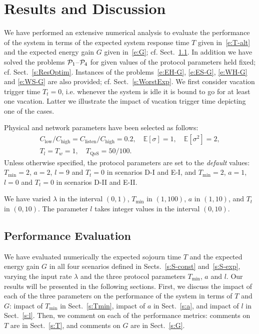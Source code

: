 \documentclass[journal]{IEEEtran}
\newcommand {\barr} {\begin{array}}
\newcommand {\earr} {\end{array}}
\def \E{{\mathbb E}}
\begin{document}
\section{Results and Discussion}
\label{s:res}
We have performed an extensive numerical analysis to evaluate the performance of the system in terms of the expected system response time $T$ given in~\eqref{e:T-alt} and the expected energy gain $G$ given in~\eqref{e:G}; cf. Sect.~\ref{s:ResPeva}. In addition we have solved the problems ${\cal P}_1$--${\cal P}_4$ for given values of the protocol parameters held fixed; cf. Sect.~\ref{s:ResOptim}. Instances of the problems~\eqref{e:EH-G}, \eqref{e:ES-G}, \eqref{e:WH-G} and \eqref{e:WS-G} are also provided; cf. Sect.~\ref{s:WorstExp}. We first consider vacation trigger time $T_t=0$, i.e. whenever the system is idle it is bound to go for at least one vacation. Latter we illustrate the impact of vacation trigger time depicting one of the cases.

Physical and network parameters have been selected as follows:
\[
\barr{lll}
{C_{\textrm{low}}}/{C_{\textrm{high}}}={ C_{\textrm{listen}}}/{C_{\textrm{high}}}=0.2 , \quad \E[\sigma]= 1 ,\quad \E[\sigma^2]=2 , \\
T_l= T_w=1,\quad T_{\textrm{QoS}}=50/100.
\earr
\]
Unless otherwise specified, the protocol parameters are set to the
{\em default} values: $T_{\min}=2$, $a=2$, $l=9$ and $T_t=0$ in scenarios D-I and
E-I, and $T_{\min}=2$, $a=1$, $l=0$ and $T_t=0$ in scenarios D-II and E-II.

We have varied $\lambda$ in the interval $(0,1)$, $T_{\min}$ in $(1,100)$, $a$
in $(1,10)$, and $T_t$ in $(0,10)$. The parameter $l$ takes integer values in the interval $(0,10)$.
\subsection{Performance Evaluation}
\label{s:ResPeva}
We have evaluated numerically the expected sojourn time $T$ and the expected energy gain $G$ in all four scenarios defined in Sects.~\ref{s:S-const} and~\ref{s:S-exp}, varying the input rate $\lambda$ and the three protocol parameters $T_{\min}$, $a$ and $l$. Our results will be presented in the following sections. First, we discuss the impact of each of the three parameters on the performance of the system in terms of $T$ and $G$: impact of $T_{\min}$ in Sect.~\ref{s:Tmin}, impact of $a$ in Sect.~\ref{s:a}, and impact of
$l$ in Sect.~\ref{s:l}. Then, we comment on each of the performance metrics: comments on $T$ are in Sect.~\ref{s:T}, and comments on $G$ are in Sect.~\ref{s:G}.
\end{document}
